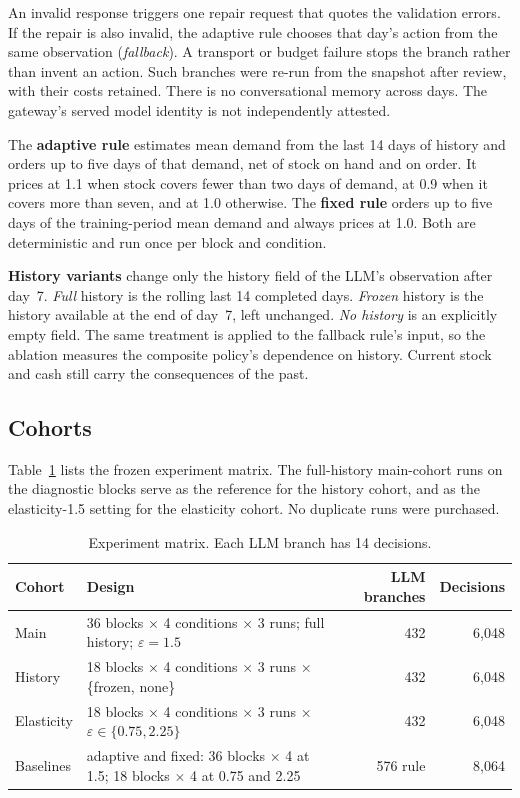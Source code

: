 \documentclass[runningheads]{llncs}
\begin{document}
An invalid response triggers one repair request that quotes the validation errors. If the repair is also invalid, the adaptive rule chooses that day's action from the same observation (\emph{fallback}). A transport or budget failure stops the branch rather than invent an action. Such branches were re-run from the snapshot after review, with their costs retained. There is no conversational memory across days. The gateway's served model identity is not independently attested.

The \textbf{adaptive rule} estimates mean demand from the last 14 days of history and orders up to five days of that demand, net of stock on hand and on order. It prices at 1.1 when stock covers fewer than two days of demand, at 0.9 when it covers more than seven, and at 1.0 otherwise. The \textbf{fixed rule} orders up to five days of the training-period mean demand and always prices at 1.0. Both are deterministic and run once per block and condition.

\textbf{History variants} change only the history field of the LLM's observation after day~7. \emph{Full} history is the rolling last 14 completed days. \emph{Frozen} history is the history available at the end of day~7, left unchanged. \emph{No history} is an explicitly empty field. The same treatment is applied to the fallback rule's input, so the ablation measures the composite policy's dependence on history. Current stock and cash still carry the consequences of the past.

\subsection{Cohorts}

Table~\ref{tab:cohorts} lists the frozen experiment matrix. The full-history main-cohort runs on the diagnostic blocks serve as the reference for the history cohort, and as the elasticity-1.5 setting for the elasticity cohort. No duplicate runs were purchased.

\begin{table}[t]
\caption{Experiment matrix. Each LLM branch has 14 decisions.}\label{tab:cohorts}
\centering\footnotesize
\begin{tabularx}{\textwidth}{@{}l X r r@{}}
\toprule
Cohort & Design & LLM branches & Decisions \\
\midrule
Main & 36 blocks $\times$ 4 conditions $\times$ 3 runs; full history; $\varepsilon=1.5$ & 432 & 6{,}048 \\
History & 18 blocks $\times$ 4 conditions $\times$ 3 runs $\times$ \{frozen, none\} & 432 & 6{,}048 \\
Elasticity & 18 blocks $\times$ 4 conditions $\times$ 3 runs $\times$ $\varepsilon \in \{0.75, 2.25\}$ & 432 & 6{,}048 \\
Baselines & adaptive and fixed: 36 blocks $\times$ 4 at 1.5; 18 blocks $\times$ 4 at 0.75 and 2.25 & 576 rule & 8{,}064 \\
\bottomrule
\end{tabularx}
\end{table}
\end{document}

